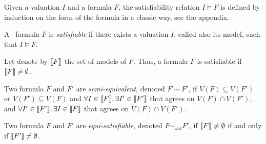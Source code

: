 Given a valuation $I$ and a formula $F$, the satisfiability relation $I \models F$ is defined by induction on the form of the formula in a classic way, see the appendix.

\begin{mydef}
  A \QFBILIA\ formula $F$ is \emph{satisfiable} if there exists a valuation $I$, called also its model, such that $I \models F$.
\end{mydef}

\noindent
Let denote by $\llbracket F \rrbracket$ the set of models of $F$. Thus, a formula $F$ is satisfiable if $\llbracket F \rrbracket\neq\emptyset$.

\begin{mydef}
  Two formula $F$ and $F'$ are \emph{semi-equivalent}, denoted $F \sim F'$,
  if $V(F)\subseteq V(F')$ or $V(F')\subseteq V(F)$ and $\forall I \in \llbracket F \rrbracket,\exists I'\in \llbracket F' \rrbracket$ that agrees on $V(F)\cap V(F')$, and $\forall I' \in \llbracket F' \rrbracket,\exists I\in \llbracket F \rrbracket$ that agrees on $V(F)\cap V(F')$.
\end{mydef}

\begin{mydef}
  Two formula $F$ and $F'$ are \emph{equi-satisfiable}, denoted $F \sim_{\mathit{sat}} F'$,
  if $\llbracket F \rrbracket\neq\emptyset$ if and only if $\llbracket F' \rrbracket\neq\emptyset$.
\end{mydef}



%

